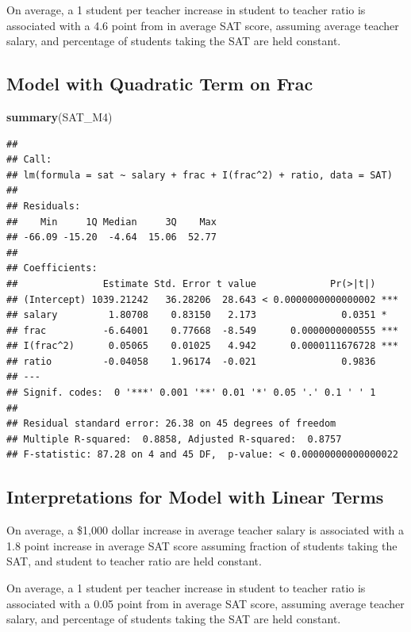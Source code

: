\documentclass[]{book}
\newenvironment{Shaded}{\begin{snugshade}}{\end{snugshade}}
\newcommand{\KeywordTok}[1]{\textcolor[rgb]{0.13,0.29,0.53}{\textbf{#1}}}
\newcommand{\NormalTok}[1]{#1}
\begin{document}
On average, a 1 student per teacher increase in student to teacher ratio
is associated with a 4.6 point from in average SAT score, assuming
average teacher salary, and percentage of students taking the SAT are
held constant.

\subsection{Model with Quadratic Term on
Frac}\label{model-with-quadratic-term-on-frac}

\begin{Shaded}
\begin{Highlighting}[]
\KeywordTok{summary}\NormalTok{(SAT_M4)}
\end{Highlighting}
\end{Shaded}

\begin{verbatim}
## 
## Call:
## lm(formula = sat ~ salary + frac + I(frac^2) + ratio, data = SAT)
## 
## Residuals:
##    Min     1Q Median     3Q    Max 
## -66.09 -15.20  -4.64  15.06  52.77 
## 
## Coefficients:
##               Estimate Std. Error t value             Pr(>|t|)    
## (Intercept) 1039.21242   36.28206  28.643 < 0.0000000000000002 ***
## salary         1.80708    0.83150   2.173               0.0351 *  
## frac          -6.64001    0.77668  -8.549      0.0000000000555 ***
## I(frac^2)      0.05065    0.01025   4.942      0.0000111676728 ***
## ratio         -0.04058    1.96174  -0.021               0.9836    
## ---
## Signif. codes:  0 '***' 0.001 '**' 0.01 '*' 0.05 '.' 0.1 ' ' 1
## 
## Residual standard error: 26.38 on 45 degrees of freedom
## Multiple R-squared:  0.8858, Adjusted R-squared:  0.8757 
## F-statistic: 87.28 on 4 and 45 DF,  p-value: < 0.00000000000000022
\end{verbatim}

\subsection{Interpretations for Model with Linear
Terms}\label{interpretations-for-model-with-linear-terms-1}

On average, a \$1,000 dollar increase in average teacher salary is
associated with a 1.8 point increase in average SAT score assuming
fraction of students taking the SAT, and student to teacher ratio are
held constant.

On average, a 1 student per teacher increase in student to teacher ratio
is associated with a 0.05 point from in average SAT score, assuming
average teacher salary, and percentage of students taking the SAT are
held constant.
\end{document}
